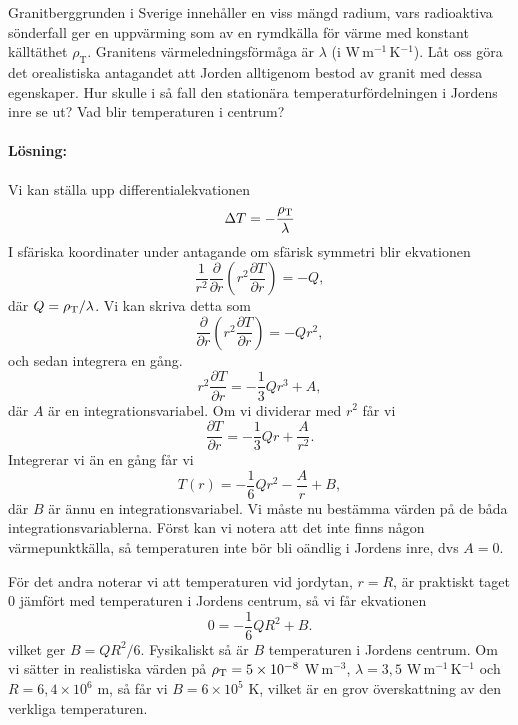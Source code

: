 \documentclass[%
oneside,                 %
final,                   %
10pt]{article}
\newenvironment{notice_mdfboxadmon}[1][]{
\begin{notice_mdfboxmdframed}[frametitle=#1]
}
{
\end{notice_mdfboxmdframed}
}
\begin{document}
\begin{notice_mdfboxadmon}

Granitberggrunden i Sverige innehåller en viss mängd
radium, vars radioaktiva sönderfall ger en uppvärming som av en rymdkälla
för värme med konstant källtäthet $\rho_\mathrm{T}$.  Granitens 
värmeledningsförmåga är $\lambda$ (i W\,m$^{-1}$\,K$^{-1}$).  Låt
oss göra det orealistiska antagandet att Jorden alltigenom bestod av granit
med dessa egenskaper.  Hur skulle i så fall den stationära 
temperaturfördelningen i Jordens inre se ut?  Vad blir temperaturen i 
centrum?

\paragraph{Lösning:}
Vi kan ställa upp differentialekvationen
\begin{equation}
  \Delta T = - \frac{\rho_{\rm T}}{\lambda}
\end{equation}
I sfäriska koordinater under antagande om sfärisk symmetri blir ekvationen
\begin{equation}
  \frac{1}{r^2} \frac{\partial}{\partial r}\left(r^2 \frac{\partial T}
{\partial r}\right) = -Q,
\end{equation}
där $Q = \rho_{\rm T}/\lambda$.  Vi kan skriva detta som
\begin{equation}
  \frac{\partial}{\partial r}\left(r^2 \frac{\partial T}
{\partial r}\right) = -Q r^2,
\end{equation}
och sedan integrera en gång.
\begin{equation}
  r^2 \frac{\partial T}{\partial r} = -\frac{1}{3}Qr^3 + A,
\end{equation}
där $A$ är en integrationsvariabel.  Om vi dividerar med $r^2$ får vi
\begin{equation}
  \frac{\partial T}{\partial r} = -\frac{1}{3}Qr + \frac{A}{r^2}.
\end{equation}
Integrerar vi än en gång får vi
\begin{equation}
  T\left(r\right) = - \frac{1}{6} Q r^2 - \frac{A}{r} + B,
\end{equation}
där $B$ är ännu en integrationsvariabel.  Vi måste nu bestämma
värden på de båda integrationsvariablerna.  Först kan vi notera
att det inte finns någon värmepunktkälla, så temperaturen inte bör bli oändlig i Jordens inre, dvs $A = 0$.

För det andra noterar vi att temperaturen vid jordytan, $r = R$, är 
praktiskt taget 0 jämfört med temperaturen i Jordens centrum, så vi
får ekvationen
\begin{equation}
  0 = -\frac{1}{6} Q R^2 + B.
\end{equation}
vilket ger $B = QR^2/6$. Fysikaliskt så är $B$ temperaturen i Jordens centrum.  Om vi sätter in realistiska värden på $\rho_{\rm T} = 5\times
10^{-8}$ W\,m$^{-3}$, $\lambda = 3,5$ W\,m$^{-1}$\,K$^{-1}$ och $R = 6,4\times
10^6$ m, så får vi $B = 6\times 10^5$ K, vilket är en grov
överskattning av den verkliga temperaturen.
\end{notice_mdfboxadmon} %
\end{document}
